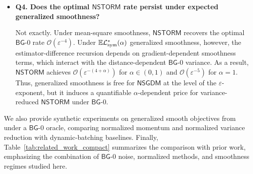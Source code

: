 \documentclass[letter,11pt]{article}
\newcommand{\E}{\mathbb{E}}
\newcommand{\Ocal}{\mathcal{O}}
\newcommand{\Lcal}{\mathcal{L}}
\begin{document}
\begin{itemize}[leftmargin=*,label={}]
    \item \textbf{Q4. Does the optimal $\mathsf{NSTORM}$ rate persist under expected generalized smoothness?}

    Not exactly. Under mean-square smoothness, $\mathsf{NSTORM}$ recovers the optimal $\mathsf{BG}$-0 rate $\Ocal(\varepsilon^{-4})$. Under $\E\Lcal_{\rm sym}^*(\alpha)$ generalized smoothness, however, the estimator-difference recursion depends on gradient-dependent smoothness terms, which interact with the distance-dependent $\mathsf{BG}$-0 variance. As a result, $\mathsf{NSTORM}$ achieves $ \Ocal(\varepsilon^{-(4+\alpha)})$ for $\alpha \in (0,1)$ and $\Ocal(\varepsilon^{-5})$ for $\alpha=1$. Thus, generalized smoothness is free for $\mathsf{NSGDM}$ at the level of the $\varepsilon$-exponent, but it induces a quantifiable $\alpha$-dependent price for variance-reduced $\mathsf{NSTORM}$ under $\mathsf{BG}$-0.
\end{itemize}
We also provide synthetic experiments on generalized smooth objectives from~\citet{chen2023generalized} under a \(\mathsf{BG}\)-0 oracle, comparing normalized momentum and normalized variance reduction with dynamic-batching baselines. Finally, Table~\ref{tab:related_work_compact} summarizes the comparison with prior work, emphasizing the combination of \(\mathsf{BG}\)-0 noise, normalized methods, and smoothness regimes studied here.
\end{document}
